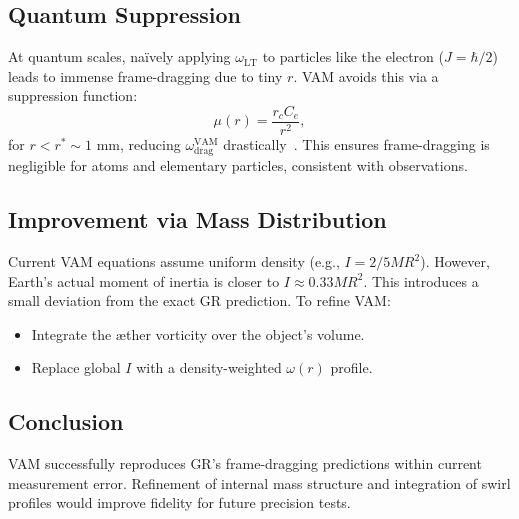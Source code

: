 \subsection*{Quantum Suppression}
At quantum scales, naïvely applying $\omega_\text{LT}$ to particles like the electron ($J = \hbar/2$) leads to immense frame-dragging due to tiny $r$. VAM avoids this via a suppression function:
\[
    \mu(r) = \frac{r_c C_e}{r^2},
\]
for $r < r^* \sim 1$ mm, reducing $\omega^\text{VAM}_\text{drag}$ drastically~\cite{iskandarani2025VAM2}. This ensures frame-dragging is negligible for atoms and elementary particles, consistent with observations.

\subsection*{Improvement via Mass Distribution}
Current VAM equations assume uniform density (e.g., $I = 2/5MR^2$). However, Earth's actual moment of inertia is closer to $I \approx 0.33MR^2$. This introduces a small deviation from the exact GR prediction. To refine VAM:
\begin{itemize}
    \item Integrate the æther vorticity over the object's volume.
    \item Replace global $I$ with a density-weighted $\omega(r)$ profile.
\end{itemize}

\subsection*{Conclusion}
VAM successfully reproduces GR's frame-dragging predictions within current measurement error. Refinement of internal mass structure and integration of swirl profiles would improve fidelity for future precision tests.